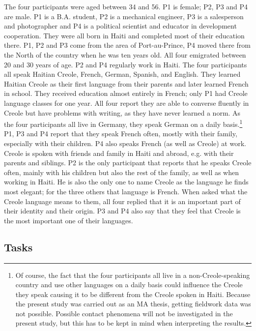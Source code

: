 \documentclass[output=paper,colorlinks,citecolor=brown]{langscibook}
\begin{document}
The four participants were aged between 34 and 56. P1 is female; P2, P3 and P4 are male. P1 is a B.A. student, P2 is a mechanical engineer, P3 is a salesperson and photographer and P4 is a political scientist and educator in development cooperation. They were all born in Haiti and completed most of their education there. P1, P2 and P3 come from the area of Port-au-Prince, P4 moved there from the North of the country when he was ten years old. All four emigrated between 20 and 30 years of age. P2 and P4 regularly work in Haiti. The four participants all speak Haitian Creole, French, German, Spanish, and English. They learned Haitian Creole as their first language from their parents and later learned French in school. They received education almost entirely in French; only P1 had Creole language classes for one year. All four report they are able to converse fluently in Creole but have problems with writing, as they have never learned a norm. As the four participants all live in Germany, they speak German on a daily basis.\footnote{Of course, the fact that the four participants all live in a non-Creole-speaking country and use other languages on a daily basis could influence the Creole they speak causing it to be different from the Creole spoken in Haiti. Because the present study was carried out as an MA thesis, getting fieldwork data was not possible. Possible contact phenomena will not be investigated in the present study, but this has to be kept in mind when interpreting the results.} P1, P3 and P4 report that they speak French often, mostly with their family, especially with their children. P4 also speaks French (as well as Creole) at work. Creole is spoken with friends and family in Haiti and abroad, e.g. with their parents and siblings. P2 is the only participant that reports that he speaks Creole often, mainly with his children but also the rest of the family, as well as when working in Haiti. He is also the only one to name Creole as the language he finds most elegant; for the three others that language is French. When asked what the Creole language means to them, all four replied that it is an important part of their identity and their origin. P3 and P4 also say that they feel that Creole is the most important one of their languages.

\subsection{Tasks}
\end{document}
